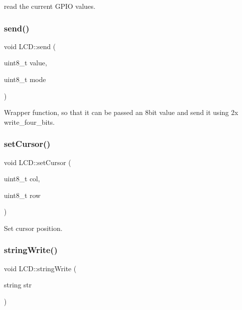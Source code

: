read the current G\+P\+IO values. 

\mbox{\label{class_l_c_d_ac740e9489fdff4f2f40fab32146e5562}} 
\subsubsection{\texorpdfstring{send()}{send()}}
{\footnotesize\ttfamily void L\+C\+D\+::send (\begin{DoxyParamCaption}\item[{uint8\+\_\+t}]{value,  }\item[{uint8\+\_\+t}]{mode }\end{DoxyParamCaption})}



Wrapper function, so that it can be passed an 8bit value and send it using 2x write\+\_\+four\+\_\+bits. 

\mbox{\label{class_l_c_d_a48220450fd152b25994eb7d0ba340e8d}} 
\subsubsection{\texorpdfstring{set\+Cursor()}{setCursor()}}
{\footnotesize\ttfamily void L\+C\+D\+::set\+Cursor (\begin{DoxyParamCaption}\item[{uint8\+\_\+t}]{col,  }\item[{uint8\+\_\+t}]{row }\end{DoxyParamCaption})}



Set cursor position. 

\mbox{\label{class_l_c_d_aa6838b75ba35ad177394599e11bc38d1}} 
\subsubsection{\texorpdfstring{string\+Write()}{stringWrite()}}
{\footnotesize\ttfamily void L\+C\+D\+::string\+Write (\begin{DoxyParamCaption}\item[{string}]{str }\end{DoxyParamCaption})}



